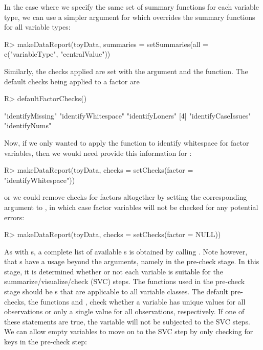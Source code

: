 \documentclass[article,shortnames]{jss}
\begin{document}
In the case where we specify the same set of summary
functions for each variable type, we can use a simpler argument for  which overrides the summary functions for all
variable types:

\begin{Schunk}
\begin{Sinput}
R> makeDataReport(toyData, 
	summaries = setSummaries(all = c("variableType", "centralValue"))
\end{Sinput}
\end{Schunk}

Similarly, the checks applied are set with the  argument and the  function. The default checks being applied to a factor are

\begin{Schunk}
\begin{Sinput}
R> defaultFactorChecks()
\end{Sinput}
\begin{Soutput}
[1] "identifyMissing"    "identifyWhitespace" "identifyLoners"    
[4] "identifyCaseIssues" "identifyNums"      
\end{Soutput}
\end{Schunk}

Now, if we only wanted to apply the function to identify whitespace
for factor variables, then we would need provide this information for :

\begin{Schunk}
\begin{Sinput}
R> makeDataReport(toyData, checks = setChecks(factor = "identifyWhitespace"))
\end{Sinput}
\end{Schunk}

or we could remove checks for factors altogether by setting the
corresponding argument to , in which case factor variables will
not be checked for any potential errors:

\begin{Schunk}
\begin{Sinput}
R> makeDataReport(toyData, checks = setChecks(factor = NULL))
\end{Sinput}
\end{Schunk}

As with s, a complete list of available
s is obtained by calling
. Note however, that s have a
usage beyond the  arguments, namely in the
pre-check stage. In this stage, it is determined whether or
not each variable is suitable for the summarize/visualize/check (SVC)
steps. The functions used in the pre-check stage should be
s that are applicable to all variable classes. The
default pre-checks, the functions  and , check
whether a variable has unique values for all observations or only a
single value for all observations, respectively. If one of these
statements are true, the variable will not be subjected to the SVC
steps.  We can allow empty variables to move on to the SVC step by
only checking for keys in the pre-check step:
\end{document}
